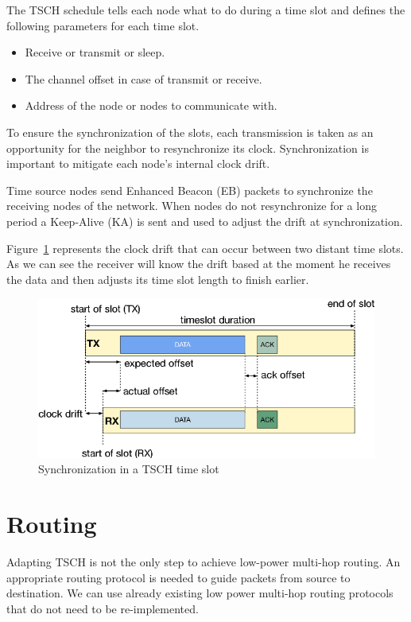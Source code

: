 The TSCH schedule tells each node what to do during a time slot and defines the
following parameters for each time slot.

\begin{itemize}
  \item Receive or transmit or sleep.
  \item The channel offset in case of transmit or receive.
  \item Address of the node or nodes to communicate with.
\end{itemize}

To ensure the synchronization of the slots, each transmission is taken as an opportunity
for the neighbor to resynchronize its clock.
Synchronization is important to mitigate each node's internal clock drift.

Time source nodes send Enhanced Beacon (EB) packets to synchronize the receiving
nodes of the network. When nodes do not resynchronize for a long period
a Keep-Alive (KA) is sent and used to adjust the drift at synchronization.

Figure~\ref{fig:sync} represents the clock drift that can occur between two
distant time slots.
As we can see the receiver will know the drift based at the moment he receives
the data and then adjusts its time slot length to finish earlier.

\begin{figure}[H]
  \centering
  \includegraphics[width=\textwidth]{thesis.tex/chapters/context/fig/sync.png}
  \caption{Synchronization in a TSCH time slot\cite{TELESHERMETO201784}\label{fig:sync}}
\end{figure}

\section{Routing}

Adapting TSCH is not the only step to achieve low-power
multi-hop routing.
An appropriate routing protocol is needed to guide packets from source to destination.
We can use already existing low power multi-hop routing protocols that do not need
to be re-implemented.

